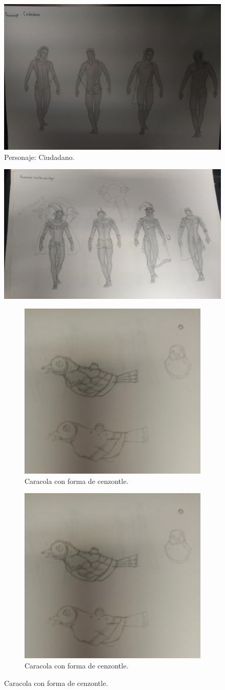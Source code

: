 \documentclass[11pt,letterpaper]{article}
\begin{document}
	\begin{figure}
	\centering
	\includegraphics[height=0.4 \linewidth]{Imagenes/ic05}
	\caption{Personaje: Ciudadano.}
	\label{fig:ciudadano01}
\end{figure}
	\begin{figure}
	\centering
	\includegraphics[height=0.4 \linewidth]{Imagenes/ic06}
	\caption{Personaje: Iztlacoliuhqui.}
	\label{fig:perIztla}
		\begin{figure}
		\centering
		\includegraphics[height=0.4 \linewidth]{Imagenes/ic02}
		\caption{Caracola con forma de cenzontle.}
		\label{fig:caracola}
	\end{figure}
	\begin{figure}
	\centering
	\includegraphics[height=0.4 \linewidth]{Imagenes/ic02}
	\caption{Caracola con forma de cenzontle.}
	\label{fig:caracola}
\end{figure}
\end{figure}
\end{document}
